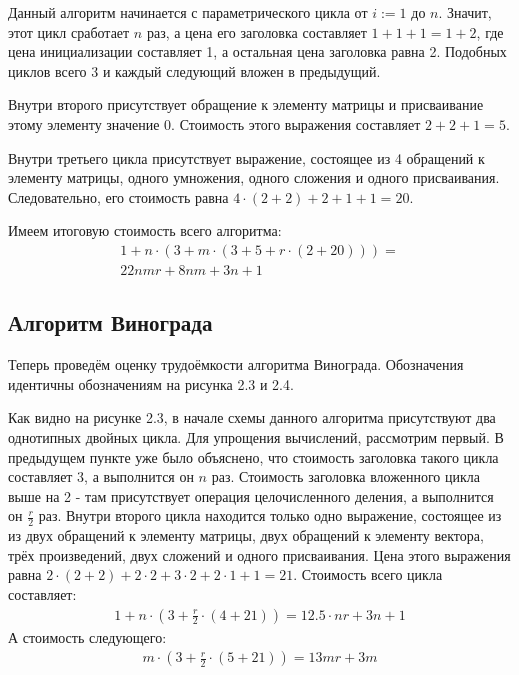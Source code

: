 Данный алгоритм начинается с параметрического цикла от $i := 1$ до $n$. Значит, этот цикл сработает $n$ раз, а цена его заголовка составляет $1 + 1 + 1 = 1 + 2$, где цена инициализации составляет 1, а остальная цена заголовка равна 2. Подобных циклов всего 3 и каждый следующий вложен в предыдущий.

Внутри второго присутствует обращение к элементу матрицы и присваивание этому элементу значение 0. Стоимость этого выражения составляет $2 + 2 + 1 = 5$.

Внутри третьего цикла присутствует выражение, состоящее из 4 обращений к элементу матрицы, одного умножения, одного сложения и одного присваивания. Следовательно, его стоимость равна $4\cdot{}(2 + 2) + 2 + 1 + 1 = 20$.

Имеем итоговую стоимость всего алгоритма:
\begin{equation}
    \begin{gathered}
    1 + n \cdot{} (3 + m \cdot{} (3 + 5 + r \cdot{} (2 + 20))) =\\
    22nmr + 8nm + 3n + 1
    \end{gathered}
\end{equation}

\subsection{Алгоритм Винограда}
Теперь проведём оценку трудоёмкости алгоритма Винограда. Обозначения идентичны обозначениям на рисунка 2.3 и 2.4.

Как видно на рисунке 2.3, в начале схемы данного алгоритма присутствуют два однотипных двойных цикла. Для упрощения вычислений, рассмотрим  первый. В предыдущем пункте уже было объяснено, что стоимость заголовка такого цикла составляет 3, а выполнится он $n$ раз. Стоимость заголовка вложенного цикла выше на 2 - там присутствует операция целочисленного деления, а выполнится он $\frac{r}{2}$ раз. Внутри второго цикла находится только одно выражение, состоящее из из двух обращений к элементу матрицы, двух обращений к элементу вектора, трёх произведений, двух сложений и одного присваивания. Цена этого выражения равна $2\cdot{}(2 + 2) + 2\cdot{}2 + 3\cdot{}2 + 2\cdot{}1 + 1 = 21$. Стоимость всего цикла составляет:
\begin{equation}
    \begin{gathered}
        1 + n\cdot{}(3 + \frac{r}{2}\cdot{}(4 + 21)) = 12.5\cdot{}nr + 3n + 1
    \end{gathered}
\end{equation}
А стоимость следующего:
\begin{equation}
    \begin{split}
        m\cdot{}(3 + \frac{r}{2}\cdot{}(5 + 21)) = 13mr + 3m
    \end{split}
\end{equation}

